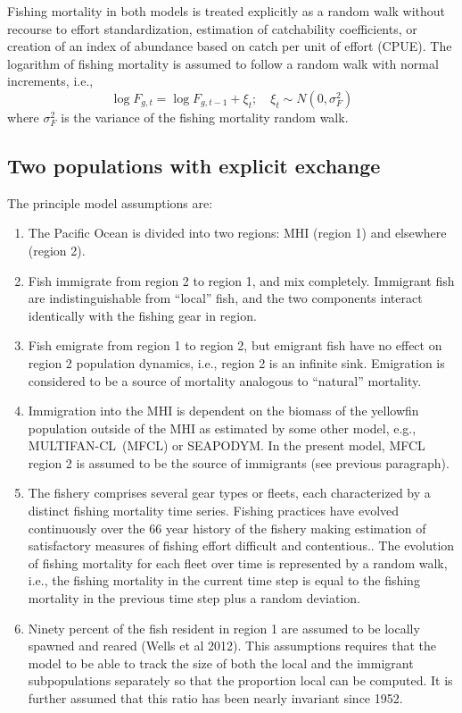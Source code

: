 \documentclass[12pt,letterpaper,twoside]{article}
\newcommand\SD{SEAPODYM}
\newcommand\MFCL{MULTIFAN-CL}
\begin{document}
Fishing mortality in both models is treated explicitly as a random walk
without recourse to effort standardization,
estimation of catchability coefficients, or creation of an
index of abundance based on catch per unit of effort (CPUE). 
The logarithm of fishing
mortality is assumed to
follow a random walk with normal increments, i.e.,
\begin{equation}
\log F_{g,t} = \log F_{g,t-1} + \xi_t;\quad \xi_t\sim
N(0,\sigma^2_F) \label{eqn:Fwalk}
\end{equation}
where  $\sigma^2_F$ is the variance of the fishing
mortality random walk.


\subsection{Two populations with explicit exchange}
The principle model assumptions are:
\begin{enumerate}
\item The Pacific Ocean is divided into two regions:
MHI (region 1) and elsewhere (region 2).
\item Fish immigrate from region 2 to region 1, and mix completely.
Immigrant fish are indistinguishable from ``local'' fish,
and the two components interact identically with the fishing gear in
region.
\item Fish emigrate from region 1 to region 2, but emigrant fish have
no effect on region 2 population dynamics, i.e., region 2 is an infinite
sink. Emigration is considered to be a source of mortality analogous
to ``natural'' mortality.
\item Immigration into the MHI is dependent on the
biomass of the yellowfin population outside of the MHI as estimated by
some other model, e.g., \MFCL\ (MFCL) or \SD. In the present model,
MFCL region 2 is assumed to be the source of immigrants (see previous
paragraph).
\item The fishery comprises several gear types or fleets, each
characterized by a distinct fishing mortality time series.
Fishing practices have evolved continuously over the 66 year history
of the fishery making estimation of satisfactory measures of fishing
effort difficult and contentious..
The evolution of fishing mortality for each fleet over time is
represented by a random walk,
i.e., the fishing mortality in the current time step is equal
to the fishing mortality in the previous time step plus a random
deviation.
\item Ninety percent of the fish resident in region 1 are assumed to
be locally spawned and reared (Wells et al 2012). 
This assumptions requires that the model to be able to track
the size of both the local and the immigrant subpopulations separately so
that the proportion local can be computed. It is
further assumed that this ratio has been nearly invariant since 1952.
\end{enumerate}
\end{document}
